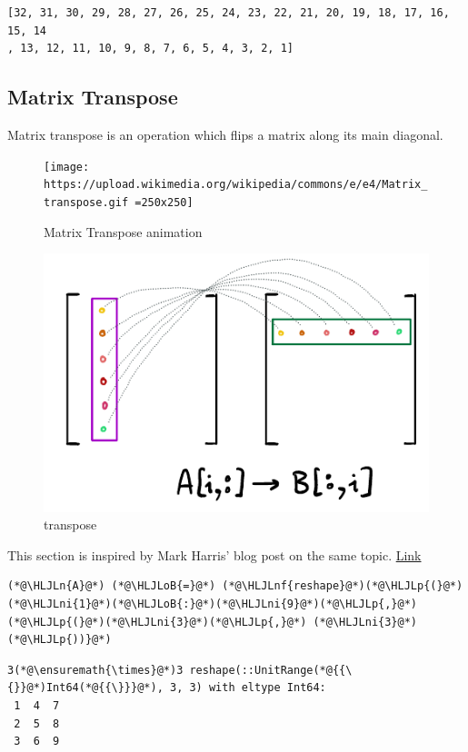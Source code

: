 \documentclass[12pt,a4paper]{article}
\newcommand{\HLJLn}[1]{#1}
\newcommand{\HLJLnf}[1]{\textcolor[RGB]{66,102,213}{#1}}
\newcommand{\HLJLni}[1]{\textcolor[RGB]{59,151,46}{#1}}
\newcommand{\HLJLoB}[1]{\textcolor[RGB]{102,102,102}{\textbf{#1}}}
\newcommand{\HLJLp}[1]{#1}
\begin{document}
\begin{lstlisting}
[32, 31, 30, 29, 28, 27, 26, 25, 24, 23, 22, 21, 20, 19, 18, 17, 16, 15, 14
, 13, 12, 11, 10, 9, 8, 7, 6, 5, 4, 3, 2, 1]
\end{lstlisting}


\subsection{Matrix Transpose}
Matrix transpose is an operation which flips a matrix along its main diagonal.

\begin{figure}
\centering
\texttt{[image: https://upload.wikimedia.org/wikipedia/commons/e/e4/Matrix\_transpose.gif =250x250]}
\caption{Matrix Transpose animation}
\end{figure}


\begin{figure}
\centering
\includegraphics{./assets/transpose.png}
\caption{transpose}
\end{figure}


This section is inspired by Mark Harris' blog post on the same topic. \href{https://developer.nvidia.com/blog/efficient-matrix-transpose-cuda-cc/}{Link}


\begin{lstlisting}
(*@\HLJLn{A}@*) (*@\HLJLoB{=}@*) (*@\HLJLnf{reshape}@*)(*@\HLJLp{(}@*)(*@\HLJLni{1}@*)(*@\HLJLoB{:}@*)(*@\HLJLni{9}@*)(*@\HLJLp{,}@*) (*@\HLJLp{(}@*)(*@\HLJLni{3}@*)(*@\HLJLp{,}@*) (*@\HLJLni{3}@*)(*@\HLJLp{))}@*)
\end{lstlisting}

\begin{lstlisting}
3(*@\ensuremath{\times}@*)3 reshape(::UnitRange(*@{{\{}}@*)Int64(*@{{\}}}@*), 3, 3) with eltype Int64:
 1  4  7
 2  5  8
 3  6  9
\end{lstlisting}
\end{document}
